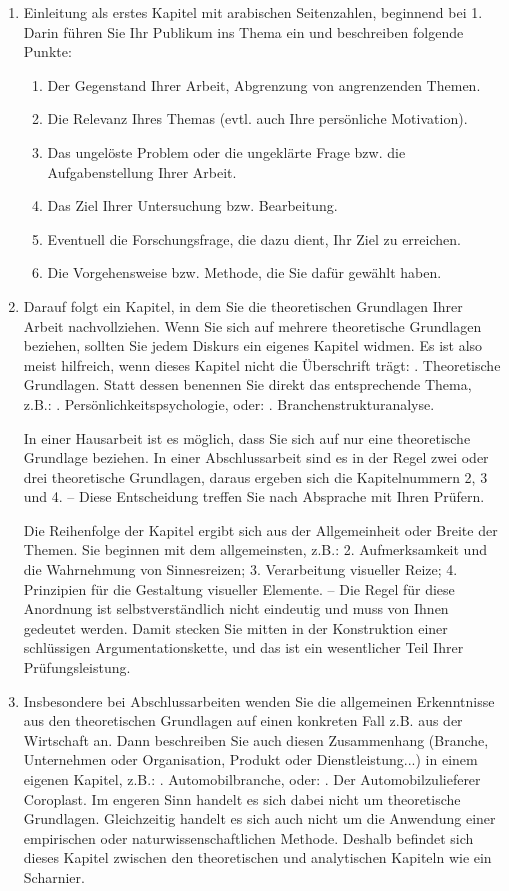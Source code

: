 \begin{enumerate}
\item Einleitung als erstes Kapitel mit arabischen Seitenzahlen, beginnend bei 1. Darin führen Sie Ihr Publikum ins Thema ein und beschreiben folgende Punkte:
  \begin{enumerate}[label*=\arabic*.]
  \item Der Gegenstand Ihrer Arbeit, Abgrenzung von angrenzenden Themen.
  \item Die Relevanz Ihres Themas (evtl. auch Ihre persönliche Motivation).
  \item Das ungelöste Problem oder die ungeklärte Frage bzw. die Aufgabenstellung Ihrer Arbeit.
  \item Das Ziel Ihrer Untersuchung bzw. Bearbeitung.
  \item Eventuell die Forschungsfrage, die dazu dient, Ihr Ziel zu erreichen.
  \item Die Vorgehensweise bzw. Methode, die Sie dafür gewählt haben.
  \end{enumerate}

\item Darauf folgt ein Kapitel, in dem Sie die theoretischen Grundlagen Ihrer Arbeit nachvollziehen. Wenn Sie sich auf mehrere theoretische Grundlagen beziehen, sollten Sie jedem Diskurs ein eigenes Kapitel widmen. Es ist also meist hilfreich, wenn dieses Kapitel nicht die Überschrift trägt: . Theoretische Grundlagen\grqq{}. Statt dessen benennen Sie direkt das entsprechende Thema, z.B.: . Persönlichkeitspsychologie\grqq{}, oder: . Branchenstrukturanalyse\grqq{}.

In einer Hausarbeit ist es möglich, dass Sie sich auf nur eine theoretische Grundlage beziehen. In einer Abschlussarbeit sind es in der Regel zwei oder drei theoretische Grundlagen, daraus ergeben sich die Kapitelnummern 2, 3 und 4. – Diese Entscheidung treffen Sie nach Absprache mit Ihren Prüfern.

Die Reihenfolge der Kapitel ergibt sich aus der Allgemeinheit oder Breite der Themen. Sie beginnen mit dem allgemeinsten, z.B.: 2. Aufmerksamkeit und die Wahrnehmung von Sinnesreizen; 3. Verarbeitung visueller Reize; 4. Prinzipien für die Gestaltung visueller Elemente. – Die Regel für diese Anordnung ist selbstverständlich nicht eindeutig und muss von Ihnen gedeutet werden. Damit stecken Sie mitten in der Konstruktion einer schlüssigen Argumentationskette, und das ist ein wesentlicher Teil Ihrer Prüfungsleistung.

\item Insbesondere bei Abschlussarbeiten wenden Sie die allgemeinen Erkenntnisse aus den theoretischen Grundlagen auf einen konkreten Fall z.B. aus der Wirtschaft an. Dann beschreiben Sie auch diesen Zusammenhang (Branche, Unternehmen oder Organisation, Produkt oder Dienstleistung...) in einem eigenen Kapitel, z.B.: . Automobilbranche\grqq{}, oder: . Der Automobilzulieferer Coroplast\grqq{}. Im engeren Sinn handelt es sich dabei nicht um theoretische Grundlagen. Gleichzeitig handelt es sich auch nicht um die Anwendung einer empirischen oder naturwissenschaftlichen Methode. Deshalb befindet sich dieses Kapitel zwischen den theoretischen und analytischen Kapiteln wie ein Scharnier.


\end{enumerate}
